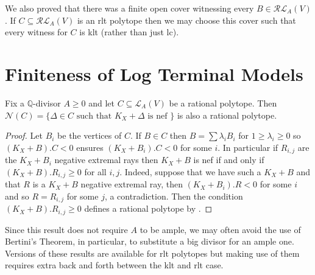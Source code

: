 	We also proved that there was a finite open cover witnessing every $B \in \mathcal{RL}_{A}(V)$. If $C \subseteq \mathcal{RL}_{A}(V)$ is an rlt polytope then we may choose this cover such that every witness for $C$ is klt (rather than just lc). 

	\section{Finiteness of Log Terminal Models}
	
	
	\begin{lemma}\label{neftope}
		Fix a $\mathbb{Q}$-divisor $A \geq 0$ and let $C\subseteq \mathcal{L}_{A}(V)$ be a rational polytope. Then $\mathcal{N}(C)=\{\Delta \in C \text{ such that } K_{X}+\Delta \text{ is nef } \}$ is also a rational polytope.
	\end{lemma}

	\begin{proof}	
		Let $B_{i}$ be the vertices of $C$. If $B \in C$ then $B= \sum \lambda_{i} B_{i}$ for $1 \geq \lambda_{i} \geq 0$ so $(K_{X}+B).C <0$ ensures $(K_{X}+B_{i}).C <0$ for some $i$. In particular if $R_{i,j}$ are the $K_{X}+B_{i}$ negative extremal rays then $K_{X}+B$ is nef if and only if $(K_{X}+B).R_{i,j} \geq 0$ for all $i,j$. Indeed, suppose that we have such a $K_{X}+B$ and that $R$ is a $K_{X}+B$ negative extremal ray, then $(K_{X}+B_{i}).R <0$ for some $i$ and so $R=R_{i,j}$ for some $j$, a contradiction. Then the condition $(K_{X}+B).R_{i,j} \geq 0$ defines a rational polytope by \cite[Proposition 9.31]{bhatt2020globally+}.
	\end{proof}
	
	Since this result does not require $A$ to be ample, we may often avoid the use of Bertini's Theorem, \cite[Lemma 3.7.3]{birkar2010existence} in particular, to substitute a big divisor for an ample one. Versions of these results are available for rlt polytopes but making use of them requires extra back and forth between the klt and rlt case. 
	
